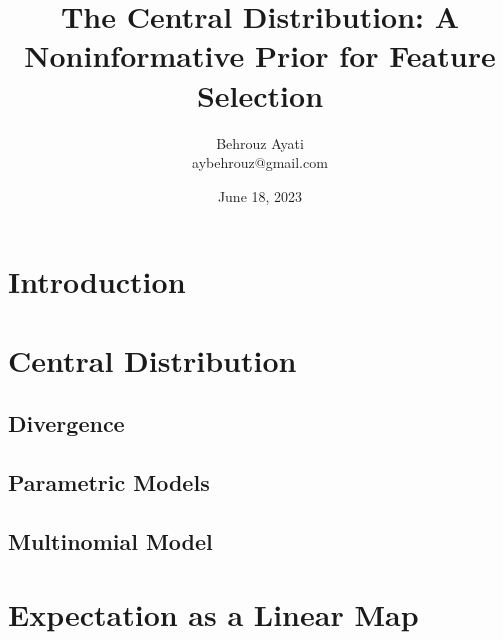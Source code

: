 \documentclass[a4paper, 12pt]{article}
\title{The Central Distribution: A Noninformative Prior for Feature Selection}
\author{Behrouz Ayati \\ aybehrouz@gmail.com}
\date{June 18, 2023}
\theoremstyle{definition}
\begin{document}
    \maketitle



    \section{Introduction}\label{sec:introduction}
    




    \section{Central Distribution}\label{sec:prior} {
        

        \subsection{Divergence}\label{subsec:divergence}
        

        \subsection{Parametric Models} {
            
        } \label{subsec:parametric-models}

        \subsection{Multinomial Model} {
            
        } \label{subsec:multinomial-model}
    }

    \appendix


    \section{Expectation as a Linear Map}
    {
        
    }\label{sec:expectation-as-a-linear-map}


    
    
\end{document}
